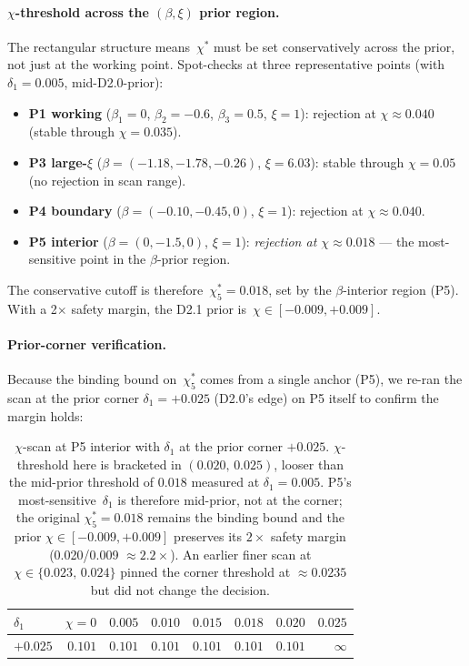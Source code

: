 \paragraph{$\chi$-threshold across the $(\beta,\xi)$ prior region.}
The rectangular structure means~$\chi^*$ must be set conservatively
across the prior, not just at the working point.  Spot-checks at three
representative points (with $\delta_1=0.005$, mid-D2.0-prior):

\begin{itemize}
  \item \textbf{P1 working} ($\beta_1=0$, $\beta_2=-0.6$, $\beta_3=0.5$, $\xi=1$):
    rejection at $\chi \approx 0.040$ (stable through $\chi=0.035$).
  \item \textbf{P3 large-$\xi$} ($\beta=(-1.18,-1.78,-0.26)$, $\xi=6.03$):
    stable through $\chi=0.05$ (no rejection in scan range).
  \item \textbf{P4 boundary} ($\beta=(-0.10,-0.45,0)$, $\xi=1$):
    rejection at $\chi \approx 0.040$.
  \item \textbf{P5 interior} ($\beta=(0,-1.5,0)$, $\xi=1$):
    \emph{rejection at $\chi \approx 0.018$} --- the most-sensitive
    point in the $\beta$-prior region.
\end{itemize}

The conservative cutoff is therefore~$\chi^*_5 = 0.018$, set by the
$\beta$-interior region (P5).  With a 2$\times$ safety margin, the
D2.1 prior is~$\chi \in [-0.009, +0.009]$.

\paragraph{Prior-corner verification.}
Because the binding bound on~$\chi^*_5$ comes from a single anchor
(P5), we re-ran the scan at the prior corner $\delta_1 = +0.025$
(D2.0's edge) on P5 itself to confirm the margin holds:

\begin{table}[h]
\centering
\begin{tabular}{lrrrrrrr}
\toprule
\textbf{$\delta_1$} & $\chi=0$ & $0.005$ & $0.010$ & $0.015$ & $0.018$ & $0.020$ & $0.025$ \\
\midrule
$+0.025$ & $0.101$ & $0.101$ & $0.101$ & $0.101$ & $0.101$ & $0.101$ & $\infty$ \\
\bottomrule
\end{tabular}
\caption{$\chi$-scan at P5 interior with $\delta_1$ at the prior
corner $+0.025$.  $\chi$-threshold here is bracketed in
$(0.020,\,0.025)$, looser than the mid-prior threshold of $0.018$
measured at $\delta_1=0.005$.  P5's most-sensitive~$\delta_1$ is
therefore mid-prior, not at the corner; the original
$\chi^*_5 = 0.018$ remains the binding bound and the prior
$\chi \in [-0.009, +0.009]$ preserves its $2\times$ safety margin
(0.020/0.009 $\approx 2.2\times$).  An earlier finer scan at
$\chi \in \{0.023,\,0.024\}$ pinned the corner threshold at
$\approx 0.0235$ but did not change the decision.}
\label{tab:d21-p5-corner-verification}
\end{table}

